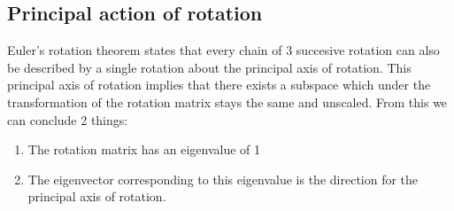 \documentclass[11pt, a4paper]{article}
\numberwithin{equation}{section}
\numberwithin{figure}{section}
\begin{document}
\subsection{Principal action of rotation}
Euler's rotation theorem states that every chain of 3 succesive rotation can also be described by a single rotation about the principal axis of rotation. This principal axis of rotation implies that there exists a subspace which under the transformation of the rotation matrix stays the same and unscaled. From this we can conclude 2 things:
\begin{enumerate}
  \item The rotation matrix has an eigenvalue of 1
  \item The eigenvector corresponding to this eigenvalue is the direction for the principal axis of rotation.
\end{enumerate}
\end{document}
